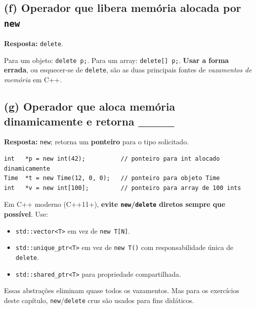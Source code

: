 \documentclass[11pt,a4paper]{article}
\begin{document}
\subsection*{(f) Operador que libera mem\'oria alocada por \texttt{new}}

\begin{resposta}\textbf{Resposta:} \texttt{delete}.\end{resposta}

Para um objeto: \texttt{delete p;}. Para um array: \texttt{delete[] p;}. \textbf{Usar a forma errada}, ou esquecer-se de \texttt{delete}, s\~ao as duas principais fontes de \emph{vazamentos de mem\'oria} em C++.

\subsection*{(g) Operador que aloca mem\'oria dinamicamente e retorna \_\_\_\_}

\begin{resposta}\textbf{Resposta:} \texttt{new}; retorna um \textbf{ponteiro} para o tipo solicitado.\end{resposta}

\begin{lstlisting}[style=cppcode,numbers=none]
int   *p = new int(42);          // ponteiro para int alocado dinamicamente
Time  *t = new Time(12, 0, 0);   // ponteiro para objeto Time
int   *v = new int[100];         // ponteiro para array de 100 ints
\end{lstlisting}

\begin{boaprat}
Em C++ moderno (C++11+), \textbf{evite \texttt{new}/\texttt{delete} diretos sempre que poss\'ivel}. Use:

\begin{itemize}[leftmargin=*,itemsep=0pt]
  \item \texttt{std::vector<T>} em vez de \texttt{new T[N]}.
  \item \texttt{std::unique\_ptr<T>} em vez de \texttt{new T()} com responsabilidade \'unica de \texttt{delete}.
  \item \texttt{std::shared\_ptr<T>} para propriedade compartilhada.
\end{itemize}

Essas abstra\c{c}\~oes eliminam quase todos os vazamentos. Mas para os exerc\'icios deste cap\'itulo, \texttt{new}/\texttt{delete} crus s\~ao usados para fins did\'aticos.
\end{boaprat}
\end{document}
